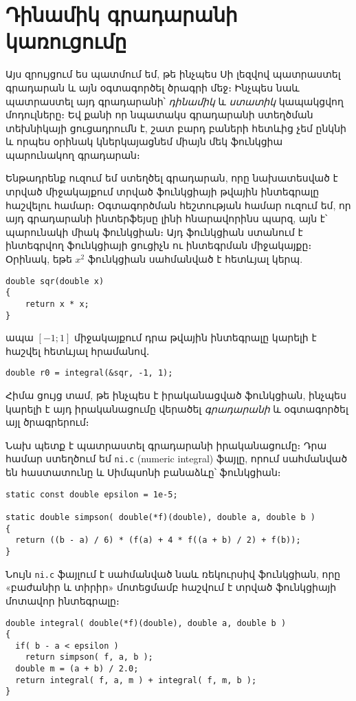 \chapter{Դինամիկ գրադարանի կառուցումը}

Այս զրույցում ես պատմում եմ, թե ինչպես Սի լեզվով պատրաստել
գրադարան և այն օգտագործել ծրագրի մեջ։ Ինչպես նաև պատրաստել
այդ գրադարանի՝ \emph{դինամիկ} և \emph{ստատիկ} կապակցվող
մոդուլները։ Եվ քանի որ նպատակս գրադարանի ստեղծման տեխնիկայի
ցուցադրումն է, շատ բարդ բաների հետևից չեմ ընկնի և որպես
օրինակ կներկայացնեմ միայն մեկ ֆունկցիա պարունակող գրադարան։

Ենթադրենք ուզում եմ ստեղծել գրադարան, որը նախատեսված է տրված
միջակայքում տրված ֆունկցիայի թվային ինտեգրալը հաշվելու համար։
Օգտագործման հեշտության համար ուզում եմ, որ այդ գրադարանի
ինտերֆեյսը լինի հնարավորինս պարզ, այն է՝ պարունակի միակ
 ֆունկցիան։ Այդ ֆունկցիան ստանում է ինտեգրվող
ֆունկցիայի ցուցիչն ու ինտեգրման միջակայքը։ Օրինակ, եթե \(x^2\)
ֆունկցիան սահմանված է հետևյալ կերպ.

\begin{Verbatim}
double sqr(double x)
{
    return x * x;
}
\end{Verbatim}

ապա \([-1;1]\) միջակայքում դրա թվային ինտեգրալը կարելի է հաշվել
հետևյալ հրամանով․

\begin{Verbatim}
double r0 = integral(&sqr, -1, 1);
\end{Verbatim}

Հիմա ցույց տամ, թե ինչպես է իրականացված 
ֆունկցիան, ինչպես կարելի է այդ իրականացումը վերածել
\emph{գրադարանի} և օգտագործել այլ ծրագրերում։

Նախ պետք է պատրաստել գրադարանի իրականացումը։ Դրա համար ստեղծում
եմ \texttt{ni.c} (numeric integral) ֆայլը, որում սահմանված են
 հաստատունը և Սիմպսոնի բանաձևը՝ 
ֆունկցիան։

\begin{Verbatim}
static const double epsilon = 1e-5;

static double simpson( double(*f)(double), double a, double b )
{
  return ((b - a) / 6) * (f(a) + 4 * f((a + b) / 2) + f(b));
}
\end{Verbatim}

Նույն \texttt{ni.c} ֆայլում է սահմանված նաև 
ռեկուրսիվ ֆունկցիան, որը «բաժանիր և տիրիր» մոտեցմամբ հաշվում
է տրված ֆունկցիայի մոտավոր ինտեգրալը։

\begin{Verbatim}
double integral( double(*f)(double), double a, double b )
{
  if( b - a < epsilon )
    return simpson( f, a, b );
  double m = (a + b) / 2.0;
  return integral( f, a, m ) + integral( f, m, b );
}
\end{Verbatim}

